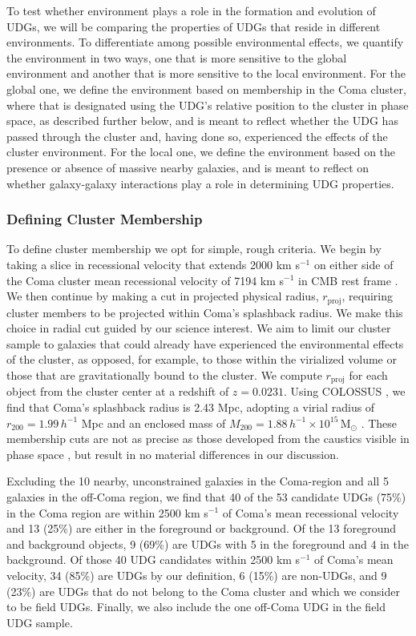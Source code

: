 \documentclass[twocolumn,tighten]{aastex63}
\begin{document}
To test whether environment plays a role in the formation and evolution of UDGs, we will be comparing the properties of UDGs that reside in different environments. To differentiate among possible environmental effects, we quantify the environment in two ways, one that is more sensitive to the global environment and another that is more sensitive to the local environment. For the global one, we define the environment based on membership in the Coma cluster, where that is designated using the UDG's relative position to the cluster in phase space, as described further below, and is meant to reflect whether 
the UDG has passed through the cluster and, having done so,
experienced the effects of the cluster environment. For the local one, we define the environment based on
the presence or absence of massive nearby galaxies, and is meant to reflect on whether galaxy-galaxy interactions play a role in determining UDG properties.

\medskip
\subsubsection{Defining Cluster Membership}
\label{cluster_mem}

To define cluster membership we opt for simple, rough criteria. We begin by taking a slice in recessional velocity that extends 2000 km s$^{-1}$ on either side of the Coma cluster mean recessional velocity of 7194 km s$^{-1}$ in CMB rest frame \citep[6925 km s$^{-1}$ in heliocentric rest frame;][]{Struble1999}. We then continue by making a cut in projected physical radius, $r_\mathrm{proj}$, requiring cluster members to be projected within Coma's splashback radius. We make this choice in radial cut guided by our science interest. We aim to limit our cluster sample to galaxies that could already have experienced the environmental effects of the cluster, as opposed, for example, to those within the virialized volume or those that are gravitationally bound to the cluster. We compute  $r_\mathrm{proj}$ for each object from the cluster center  at a redshift of $z=0.0231$. Using COLOSSUS \citep{colossus}, we find that Coma's splashback radius is 2.43 Mpc, adopting a virial radius of $r_{200}=1.99 \, h^{-1}$ Mpc and an enclosed mass of $M_{200}=1.88 \, h^{-1} \times 10^{15} \, \mathrm{M}_\odot$ \citep{Kubo2007}. These membership cuts are not as precise as those developed from the caustics visible in phase space \citep[see][]{Geller99}, but result in no material differences in our discussion.

Excluding the 10 nearby, unconstrained galaxies in the Coma-region and all 5 galaxies in the off-Coma region, we find that 40 of the 53 candidate UDGs (75\%) in the Coma region are within 2500 km s$^{-1}$ of Coma's mean recessional velocity and 13 (25\%) are either in the foreground or background. Of the 13 foreground and background objects, 9 (69\%) are UDGs with 5 in the foreground and 4 in the background.
Of those 40 UDG candidates within 2500 km s$^{-1}$ of Coma's mean velocity, 34 (85\%) are UDGs by our definition, 6 (15\%) are non-UDGs, and 9 (23\%) are UDGs that do not belong to the Coma cluster and which we consider to be field UDGs. 
Finally, we also include the one off-Coma UDG in the field UDG sample.
\end{document}
